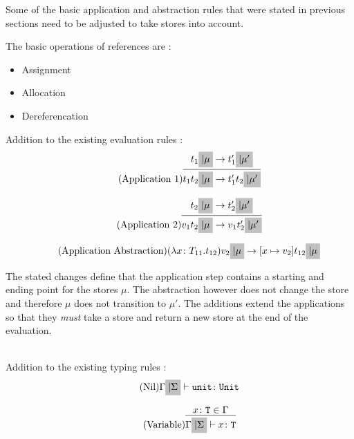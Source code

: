 Some of the basic application and abstraction rules that were stated in previous
sections need to be adjusted to take stores into account.

The basic operations of references are \cite{pierce2002ProgLang}:

\begin{itemize}
    \item Assignment
    \item Allocation
    \item Dereferencation
\end{itemize}

Addition to the existing evaluation rules \cite{pierce2002ProgLang}:
\begin{equation*}
    \tag{Application 1}
    \infer{
        t_1 t_2 \colorbox{lightgray}{$| \mu$} \rightarrow t'_1 t_2 \colorbox{lightgray}{$| \mu'$}
    }{
        t_1 \colorbox{lightgray}{$| \mu$} \rightarrow t'_1 \colorbox{lightgray}{$| \mu'$}
    }
\end{equation*}

\begin{equation*}
    \tag{Application 2}
    \infer{
        v_1 t_2 \colorbox{lightgray}{$| \mu$} \rightarrow v_1 t'_2 \colorbox{lightgray}{$| \mu'$}
    }{
        t_2 \colorbox{lightgray}{$| \mu$} \rightarrow t'_2 \colorbox{lightgray}{$| \mu'$}
    }
\end{equation*}

\begin{equation*}
    \tag{Application Abstraction}
    (\lambda x \colon T_{11} . t_{12}) v_2 \colorbox{lightgray}{$| \mu$} \rightarrow [x \mapsto v_2] t_{12} \colorbox{lightgray}{$| \mu$}
\end{equation*}

The stated changes define that the application step contains
a starting and ending point for the stores $\mu$. The
abstraction however does not change the store and therefore $\mu$ does
not transition to $\mu'$. The additions extend the applications so that
they \textit{must} take a store and return a new store at the end
of the evaluation.

~\\
Addition to the existing typing rules \cite{pierce2002ProgLang}:
\begin{equation*}
    \tag{Nil}
    \Gamma \colorbox{lightgray}{$| \Sigma$} \vdash \texttt{unit} \colon \texttt{Unit}
\end{equation*}

\begin{equation*}
    \tag{Variable}
    \infer{
        \Gamma \colorbox{lightgray}{$| \Sigma$} \vdash x \colon \texttt{T}
    }{
        x \colon \texttt{T} \in \Gamma
    }
\end{equation*}

